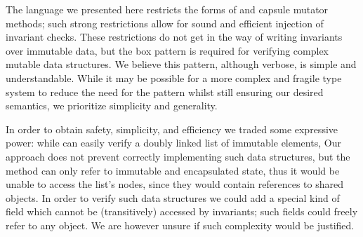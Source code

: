 







The language we presented here restricts the forms of \Q@invariant@ and capsule mutator methods;
such strong restrictions allow for sound and efficient injection of invariant checks. 
These restrictions do not get in the way of writing invariants over immutable data, but the box pattern is required for verifying complex mutable data structures. We believe this pattern, although verbose, is simple and understandable. While it may be possible for a more complex and fragile type system to reduce the need for the pattern whilst still ensuring our desired semantics, we prioritize simplicity and generality. 

In order to obtain safety, simplicity, and efficiency we traded some expressive power: while can easily verify a doubly linked list of immutable elements,  Our approach does not prevent correctly implementing such data structures, but the \Q@invariant@ method can only refer to immutable and encapsulated state, thus it would be unable to access the list's nodes, since they would contain \Q@mut@ references to shared objects.
In order to verify such data structures we could add a special kind of field which cannot be (transitively) accessed by invariants; such fields could freely refer to any object. We are however unsure if such complexity would be justified.


